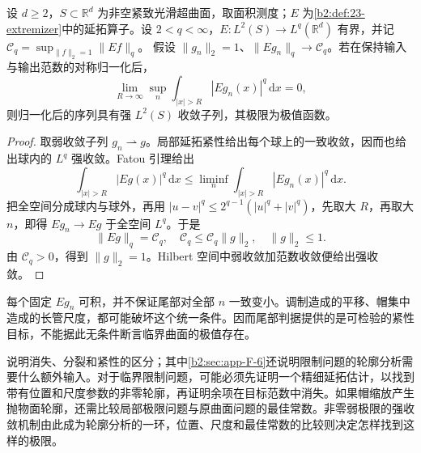 \begin{proposition}[统一输出尾部判据]\label{b2:prop:23-extremizer-tail}
设 \(d\geq2\)，\(S\subset\mathbb R^d\) 为非空紧致光滑超曲面，取面积测度；\(E\) 为\cref{b2:def:23-extremizer}中的延拓算子。设 \(2<q<\infty\)，\(E:L^2(S)\to L^q(\mathbb R^d)\) 有界，并记
\(\mathcal C_q=\sup_{\|f\|_2=1}\|Ef\|_q\)。
假设 \(\|g_n\|_2=1\)、\(\|Eg_n\|_q\to\mathcal C_q\)。若在保持输入与输出范数的对称归一化后，
\[
 \lim_{R\to\infty}\sup_n\int_{|x|>R}|Eg_n(x)|^q\,\mathrm dx=0,
\]
则归一化后的序列具有强 \(L^2(S)\) 收敛子列，其极限为极值函数。
\end{proposition}
\begin{proof}
取弱收敛子列 \(g_n\rightharpoonup g\)。局部延拓紧性给出每个球上的一致收敛，因而也给出球内的 \(L^q\) 强收敛。Fatou 引理给出
\[
 \int_{|x|>R}|Eg(x)|^q\,\mathrm dx
 \leq\liminf_n\int_{|x|>R}|Eg_n(x)|^q\,\mathrm dx.
\]
把全空间分成球内与球外，再用
\(|u-v|^q\leq2^{q-1}(|u|^q+|v|^q)\)，先取大 \(R\)，再取大 \(n\)，即得 \(Eg_n\to Eg\) 于全空间 \(L^q\)。于是
\[
 \|Eg\|_q=\mathcal C_q,\quad
 \mathcal C_q\leq\mathcal C_q\|g\|_2,\quad
 \|g\|_2\leq1.
\]
由 \(\mathcal C_q>0\)，得到 \(\|g\|_2=1\)。Hilbert 空间中弱收敛加范数收敛便给出强收敛。
\end{proof}

每个固定 \(Eg_n\) 可积，并不保证尾部对全部 \(n\) 一致变小。调制造成的平移、帽集中造成的长管尺度，都可能破坏这个统一条件。因而尾部判据提供的是可检验的紧性目标，不能据此无条件断言临界曲面的极值存在。

\ProseParagraphBreak
{}说明消失、分裂和紧性的区分；其中\cref{b2:sec:app-F-6}还说明限制问题的轮廓分析需要什么额外输入。对于临界限制问题，可能必须先证明一个精细延拓估计，以找到带有位置和尺度参数的非零轮廓，再证明余项在目标范数中消失。如果帽缩放产生抛物面轮廓，还需比较局部极限问题与原曲面问题的最佳常数。非零弱极限的强收敛机制由此成为轮廓分析的一环，位置、尺度和最佳常数的比较则决定怎样找到这样的极限。
